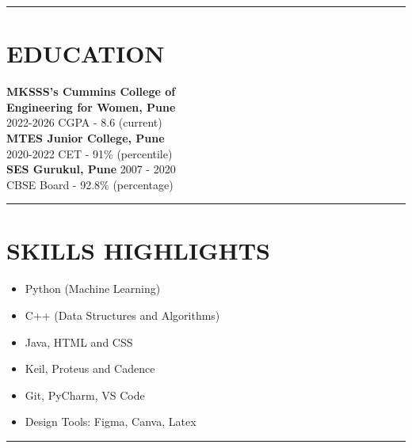\documentclass[a4paper,10pt]{article}
\begin{document}
\begin{paracol}{2} 

	\begin{leftcolumn*}
	\vspace{2em}
	\hrule
	\section*{EDUCATION}
	\textbf{MKSSS's Cummins College of \\Engineering for Women, Pune} \\
		\vspace{1em}
	2022-2026  CGPA - 8.6 (current) \\
	\textbf{MTES Junior College, Pune} \\
		\vspace{1em}
	2020-2022  CET - 91\% (percentile) \\
	\textbf{SES Gurukul, Pune}  2007 - 2020 \\
		\vspace{1em}
	CBSE Board - 92.8\% (percentage) \\
	\vspace{0.1em}
	\hrule
	\section*{SKILLS HIGHLIGHTS}
	\begin{itemize}
		\item Python (Machine Learning)
		\item C++ (Data Structures and Algorithms)
		\item Java, HTML and CSS
		\item Keil, Proteus and Cadence
		\item Git, PyCharm, VS Code
		\item Design Tools: Figma, Canva, Latex
	\end{itemize}
	\vspace{0.1em}
	\hrule

\end{leftcolumn*}
\end{paracol}
\end{document}
